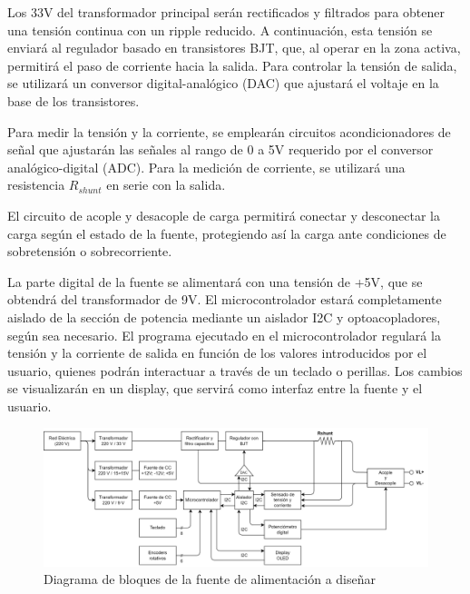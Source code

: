 Los 33V del transformador principal serán rectificados y filtrados para obtener una tensión continua con un ripple reducido. A continuación, esta tensión se enviará al regulador basado en transistores BJT, que, al operar en la zona activa, permitirá el paso de corriente hacia la salida. Para controlar la tensión de salida, se utilizará un conversor digital-analógico (DAC) que ajustará el voltaje en la base de los transistores.\par 

Para medir la tensión y la corriente, se emplearán circuitos acondicionadores de señal que ajustarán las señales al rango de 0 a 5V requerido por el conversor analógico-digital (ADC). Para la medición de corriente, se utilizará una resistencia $R_{shunt}$ en serie con la salida. \par

El circuito de acople y desacople de carga permitirá conectar y desconectar la carga según el estado de la fuente, protegiendo así la carga ante condiciones de sobretensión o sobrecorriente. \par 

La parte digital de la fuente se alimentará con una tensión de +5V, que se obtendrá del transformador de 9V. El microcontrolador estará completamente aislado de la sección de potencia mediante un aislador I2C y optoacopladores, según sea necesario. El programa ejecutado en el microcontrolador regulará la tensión y la corriente de salida en función de los valores introducidos por el usuario, quienes podrán interactuar a través de un teclado o perillas. Los cambios se visualizarán en un display, que servirá como interfaz entre la fuente y el usuario.\par

\begin{figure}[H]
    \centering
    \includegraphics[width=\textwidth]{./imagenes/Diagrama_Bloques_general.jpg}
    \caption{Diagrama de bloques de la fuente de alimentación a diseñar}
    \label{F:Diagrama_Bloques_general}
\end{figure}


